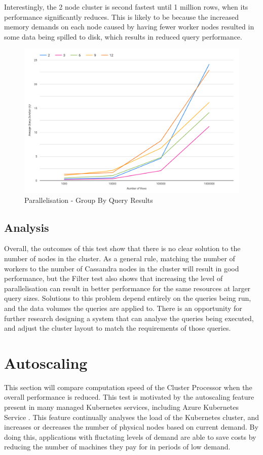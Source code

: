 Interestingly, the 2 node cluster is second fastest until 1 million rows, when its performance significantly reduces. This is likely to be because the increased memory demands on each node caused by having fewer worker nodes resulted in some data being spilled to disk, which results in reduced query performance.

\begin{figure}[h]
	\centering
	\includegraphics[width=0.8\linewidth]{chapters/diagrams/testing/group-by-simple-parallelisation-test}
	\caption{Parallelisation - Group By Query Results}
	\label{fig:group-by-simple-parallelisation-test}
\end{figure}

\subsection{Analysis}
Overall, the outcomes of this test show that there is no clear solution to the number of nodes in the cluster. As a general rule, matching the number of workers to the number of Cassandra nodes in the cluster will result in good performance, but the Filter test also shows that increasing the level of parallelisation can result in better performance for the same resources at larger query sizes. Solutions to this problem depend entirely on the queries being run, and the data volumes the queries are applied to. There is an opportunity for further research designing a system that can analyse the queries being executed, and adjust the cluster layout to match the requirements of those queries.

\section{Autoscaling}
This section will compare computation speed of the Cluster Processor when the overall performance is reduced. This test is motivated by the autoscaling feature present in many managed Kubernetes services, including Azure Kubernetes Service . This feature continually analyses the load of the Kubernetes cluster, and increases or decreases the number of physical nodes based on current demand. By doing this, applications with fluctating levels of demand are able to save costs by reducing the number of machines they pay for in periods of low demand.

